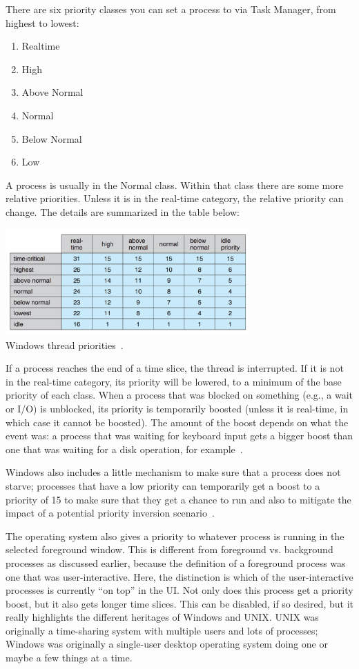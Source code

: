 There are six priority classes you can set a process to via Task Manager, from highest to lowest:
\begin{enumerate}
	\item Realtime
	\item High
	\item Above Normal
	\item Normal
	\item Below Normal
	\item Low
\end{enumerate}

A process is usually in the Normal class. Within that class there are some more relative priorities. Unless it is in the real-time category, the relative priority can change. The details are summarized in the table below:

\begin{center}
	\includegraphics[width=0.7\textwidth]{images/windows-thread-priorities.png}\\
	Windows thread priorities~\cite{osc}.
\end{center}

If a process reaches the end of a time slice, the thread is interrupted. If it is not in the real-time category, its priority will be lowered, to a minimum of the base priority of each class. When a process that was blocked on something (e.g., a wait or I/O) is unblocked, its priority is temporarily boosted (unless it is real-time, in which case it cannot be boosted). The amount of the boost depends on what the event was: a process that was waiting for keyboard input gets a bigger boost than one that was waiting for a disk operation, for example~\cite{osc}. 

Windows also includes a little mechanism to make sure that a process does not starve; processes that have a low priority can temporarily get a boost to a priority of 15 to make sure that they get a chance to run and also to mitigate the impact of a potential priority inversion scenario~\cite{osi}.

The operating system also gives a priority to whatever process is running in the selected foreground window. This is different from foreground vs. background processes as discussed earlier, because the definition of a foreground process was one that was user-interactive. Here, the distinction is which of the user-interactive processes is currently ``on top'' in the UI. Not only does this process get a priority boost, but it also gets longer time slices. This can be disabled, if so desired, but it really highlights the different heritages of Windows and UNIX. UNIX was originally a time-sharing system with multiple users and lots of processes; Windows was originally a single-user desktop operating system doing one or maybe a few things at a time.




